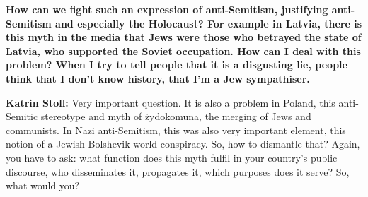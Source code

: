 



\textbf{How can we fight such an expression of anti-Semitism, justifying anti-Semitism and especially the Holocaust? For example in Latvia, there is this myth in the media that Jews were those who betrayed the state of Latvia, who supported the Soviet occupation. How can I deal with this problem? When I try to tell people that it is a disgusting lie, people think that I don't know history, that I'm a Jew sympathiser.}

\textbf{Katrin Stoll:} Very important question. It is also a problem in Poland, this anti-Semitic stereotype and myth of żydokomuna, the merging of Jews and communists. In Nazi anti-Semitism, this was also very important element, this notion of a Jewish-Bolshevik world conspiracy. So, how to dismantle that? Again, you have to ask: what function does this myth fulfil in your country’s public discourse, who disseminates it, propagates it, which purposes does it serve? So, what would you? 

